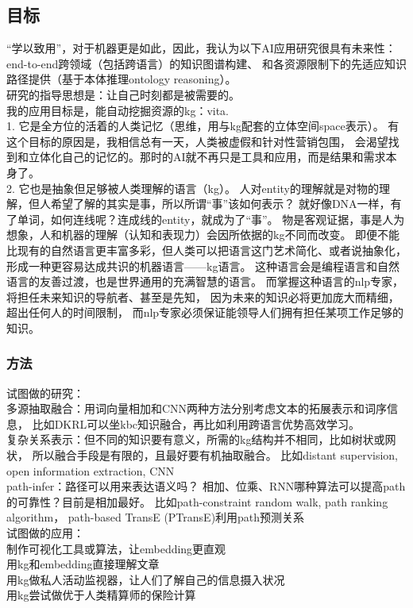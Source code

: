 \documentclass[12pt]{ctexart}
\theoremstyle{definition}
\begin{document}
\subsection{目标}
“学以致用”，对于机器更是如此，因此，我认为以下AI应用研究很具有未来性：
end-to-end跨领域（包括跨语言）的知识图谱构建、
和各资源限制下的先适应知识路径提供（基于本体推理ontology reasoning）。\\
研究的指导思想是：让自己时刻都是被需要的。\\
我的应用目标是，能自动挖掘资源的kg：vita.\\
1. 它是全方位的活着的人类记忆（思维，用与kg配套的立体空间space表示）。
有这个目标的原因是，我相信总有一天，人类被虚假和针对性营销包围，
会渴望找到和立体化自己的记忆的。那时的AI就不再只是工具和应用，而是结果和需求本身了。\\
2. 它也是抽象但足够被人类理解的语言（kg）。
人对entity的理解就是对物的理解，但人希望了解的其实是事，所以所谓“事”该如何表示？
就好像DNA一样，有了单词，如何连线呢？连成线的entity，就成为了“事”。
物是客观证据，事是人为想象，人和机器的理解（认知和表现力）会因所依据的kg不同而改变。
即便不能比现有的自然语言更丰富多彩，但人类可以把语言这门艺术简化、或者说抽象化，
形成一种更容易达成共识的机器语言——kg语言。
这种语言会是编程语言和自然语言的友善过渡，也是世界通用的充满智慧的语言。
而掌握这种语言的nlp专家，将担任未来知识的导航者、甚至是先知，
因为未来的知识必将更加庞大而精细，超出任何人的时间限制，
而nlp专家必须保证能领导人们拥有担任某项工作足够的知识。

\subsubsection{方法}
试图做的研究：\\
多源抽取融合：用词向量相加和CNN两种方法分别考虑文本的拓展表示和词序信息，
比如DKRL可以坐kbc知识融合，再比如利用跨语言优势高效学习。\\
复杂关系表示：但不同的知识要有意义，所需的kg结构并不相同，比如树状或网状，
所以融合手段是有限的，且最好要有机抽取融合。
比如distant supervision, open information extraction, CNN\\
path-infer：路径可以用来表达语义吗？
相加、位乘、RNN哪种算法可以提高path的可靠性？目前是相加最好。
比如path-constraint random walk, path ranking algorithm，
path-based TransE (PTransE)利用path预测关系\\

试图做的应用：\\
制作可视化工具或算法，让embedding更直观\\
用kg和embedding直接理解文章\\
用kg做私人活动监视器，让人们了解自己的信息摄入状况\\
用kg尝试做优于人类精算师的保险计算\\
\end{document}
